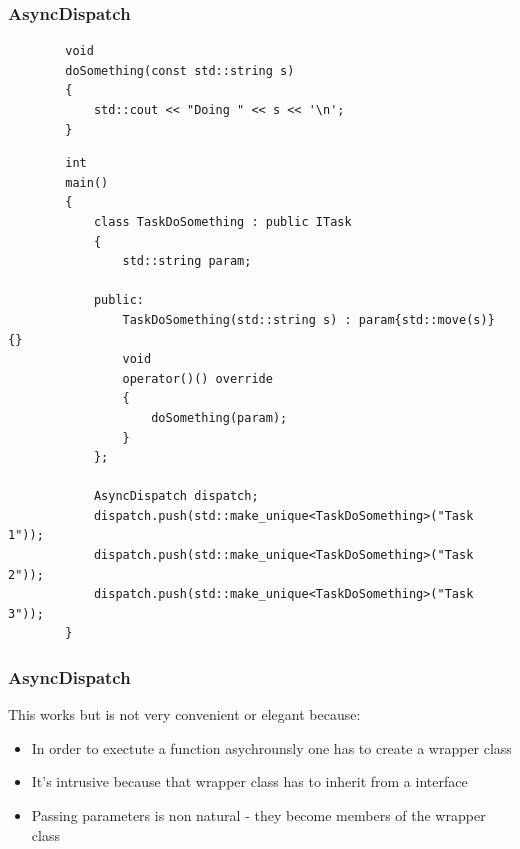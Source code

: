 \documentclass{beamer}
\begin{document}
\begin{frame}[fragile]
\frametitle{AsyncDispatch}
    \begin{lstlisting}
        void
        doSomething(const std::string s)
        {
            std::cout << "Doing " << s << '\n';
        }
    \end{lstlisting}

    \begin{lstlisting}
        int
        main()
        {
            class TaskDoSomething : public ITask
            {
                std::string param;

            public:
                TaskDoSomething(std::string s) : param{std::move(s)} {}
                void
                operator()() override
                {
                    doSomething(param);
                }
            };

            AsyncDispatch dispatch;
            dispatch.push(std::make_unique<TaskDoSomething>("Task 1"));
            dispatch.push(std::make_unique<TaskDoSomething>("Task 2"));
            dispatch.push(std::make_unique<TaskDoSomething>("Task 3"));
        }
    \end{lstlisting}
\end{frame}

\begin{frame}
\frametitle{AsyncDispatch}
    This works but is not very convenient or elegant because:
    \begin{itemize}
        \item In order to exectute a function asychrounsly one has to create a wrapper class
        \pause
        \item It's intrusive because that wrapper class has to inherit from a interface
        \pause
        \item Passing parameters is non natural - they become members of the wrapper class
    \end{itemize}
\end{frame}
\end{document}
